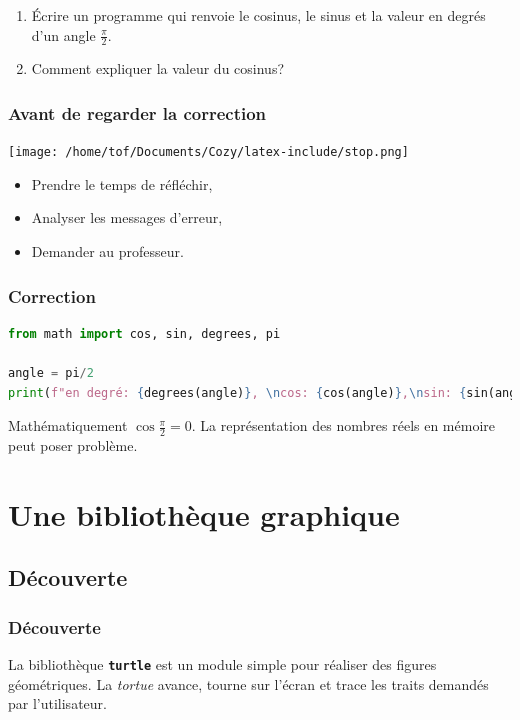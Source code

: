 \documentclass[svgnames,11pt]{beamer}
\begin{document}
\begin{frame}
    \frametitle{}

    \begin{activite}
    \begin{enumerate}
        \item Écrire un programme qui renvoie le cosinus, le sinus et la valeur en degrés d'un angle $\frac{\pi}{2}$.
        \item Comment expliquer la valeur du cosinus?
    \end{enumerate}
    \end{activite}

\end{frame}
\begin{frame}
    \frametitle{Avant de regarder la correction}
\begin{center}
    \centering
    \texttt{[image: /home/tof/Documents/Cozy/latex-include/stop.png]}
    \end{center}
{\Large
    \begin{itemize}
        \item Prendre le temps de réfléchir,
        \item Analyser les messages d'erreur,
        \item Demander au professeur.
    \end{itemize}
}
\end{frame}
\begin{frame}[fragile]
    \frametitle{Correction}

\begin{center}
\begin{lstlisting}[language=Python , basicstyle=\ttfamily\small, xleftmargin=2em, xrightmargin=2em]
from math import cos, sin, degrees, pi

angle = pi/2
print(f"en degré: {degrees(angle)}, \ncos: {cos(angle)},\nsin: {sin(angle)}")    
\end{lstlisting}
\label{CODE}
\end{center}
Mathématiquement $\cos\frac{\pi}{2}=0$. La représentation des nombres réels en mémoire peut poser problème.
\end{frame}
\section{Une bibliothèque graphique}
\subsection{Découverte}
\begin{frame}
    \frametitle{Découverte}

    La bibliothèque \textbf{\texttt{turtle}} est un module simple pour réaliser des figures géométriques. La \emph{tortue} avance, tourne sur l'écran et trace les traits demandés par l'utilisateur.

\end{frame}
\end{document}
